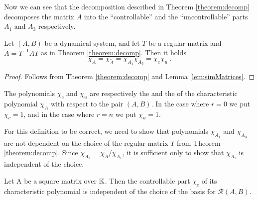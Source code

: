 Now we can see that the decomposition described in Theorem \ref{theorem:decomp} decomposes the matrix $A$ into the ``controllable'' and the ``uncontrollable'' parts $A_1$ and $A_3$ respectively.

\begin{cor}
	Let $(A,B)$ be a dynamical system, and let $T$ be a regular matrix and $\widetilde{A}=T^{-1}AT$ as in Theorem \ref{theorem:decomp}. Then it holds
	$$\chi_A=\chi_{\widetilde{A}}=\chi_{A_1}\chi_{A_3}=\chi_c\chi_u\ .$$
\end{cor} 

\begin{proof}
	Follows from Theorem \ref{theorem:decomp} and Lemma \ref{lem:simMatrices}.
\end{proof}

\begin{definition}
	The polynomials $\chi_c$ and $\chi_u$ are respectively the  and the  of the characteristic polynomial $\chi_A$ with respect to the pair $(A,B)$. In the case where $r=0$ we put $\chi_c=1$, and in the case where $r=n$ we put $\chi_u=1$.
\end{definition}

For this definition to be correct, we need to show that polynomials $\chi_{A_1}$ and $\chi_{A_3}$ are not dependent on the choice of the regular matrix $T$ from Theorem \ref{theorem:decomp}. Since $\chi_{A_3}=\chi_A/\chi_{A_1}$, it is sufficient only to show that $\chi_{A_1}$ is independent of the choice.

\begin{lemma}
	Let A be a square matrix over $\mathbb{K}$. Then the controllable part $\chi_c$ of its characteristic polynomial is independent of the choice of the basis for $\mathcal{R}(A,B)$.
\end{lemma}

